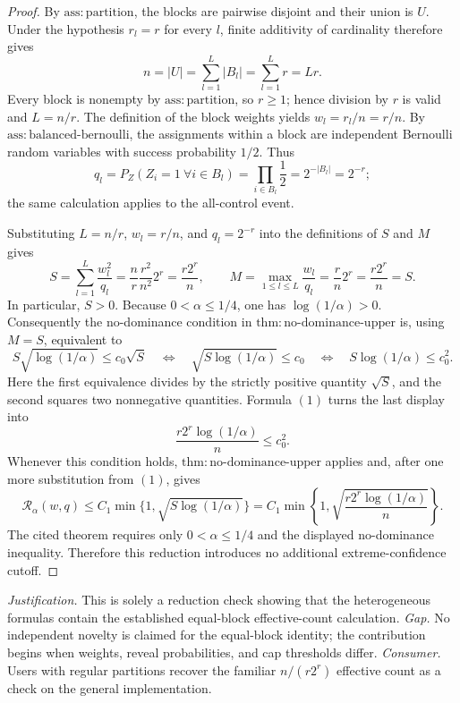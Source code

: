 \documentclass{article}
\begin{document}
\begin{proof}
By \(\mathrm{ass{:}partition}\), the blocks are pairwise disjoint and their union is \(U\).  Under the hypothesis \(r_l=r\) for every \(l\), finite additivity of cardinality therefore gives
\[
n=|U|=\sum_{l=1}^L |B_l|=\sum_{l=1}^L r=Lr.
\]
Every block is nonempty by \(\mathrm{ass{:}partition}\), so \(r\ge 1\); hence division by \(r\) is valid and \(L=n/r\).  The definition of the block weights yields \(w_l=r_l/n=r/n\).  By \(\mathrm{ass{:}balanced\text{-}bernoulli}\), the assignments within a block are independent Bernoulli random variables with success probability \(1/2\).  Thus
\[
q_l=P_Z(Z_i=1\ \forall i\in B_l)
=\prod_{i\in B_l}\frac12
=2^{-|B_l|}=2^{-r};
\]
the same calculation applies to the all-control event.

Substituting \(L=n/r\), \(w_l=r/n\), and \(q_l=2^{-r}\) into the definitions of \(S\) and \(M\) gives
\[
S=\sum_{l=1}^L\frac{w_l^2}{q_l}
=\frac nr\frac{r^2}{n^2}2^r
=\frac{r2^r}{n},
\qquad
M=\max_{1\le l\le L}\frac{w_l}{q_l}
=\frac rn2^r
=\frac{r2^r}{n}=S.
\tag{1}
\]
In particular, \(S>0\).  Because \(0<\alpha\le 1/4\), one has \(\log(1/\alpha)>0\).  Consequently the no-dominance condition in \(\mathrm{thm{:}no\text{-}dominance\text{-}upper}\) is, using \(M=S\), equivalent to
\[
S\sqrt{\log(1/\alpha)}\le c_0\sqrt S
\quad\Longleftrightarrow\quad
\sqrt{S\log(1/\alpha)}\le c_0
\quad\Longleftrightarrow\quad
S\log(1/\alpha)\le c_0^2.
\]
Here the first equivalence divides by the strictly positive quantity \(\sqrt S\), and the second squares two nonnegative quantities.  Formula \((1)\) turns the last display into
\[
\frac{r2^r\log(1/\alpha)}{n}\le c_0^2.
\]
Whenever this condition holds, \(\mathrm{thm{:}no\text{-}dominance\text{-}upper}\) applies and, after one more substitution from \((1)\), gives
\[
\mathcal R_\alpha(w,q)
\le C_1\min\{1,\sqrt{S\log(1/\alpha)}\}
=C_1\min\left\{1,
\sqrt{\frac{r2^r\log(1/\alpha)}{n}}\right\}.
\]
The cited theorem requires only \(0<\alpha\le1/4\) and the displayed no-dominance inequality.  Therefore this reduction introduces no additional extreme-confidence cutoff.
\end{proof}
\par\smallskip\noindent \textit{Justification.} This is solely a reduction check showing that the heterogeneous formulas contain the established equal-block effective-count calculation. \textit{Gap.} No independent novelty is claimed for the equal-block identity; the contribution begins when weights, reveal probabilities, and cap thresholds differ. \textit{Consumer.} Users with regular partitions recover the familiar \(n/(r2^r)\) effective count as a check on the general implementation.
\end{document}
